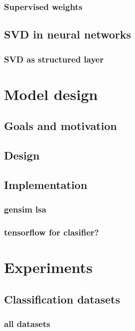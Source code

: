         \subsection{Supervised weights}
            \cite{ji2013discriminative} %
            \cite{deng2014study} %
            \cite{lan2009supervised} %

    
    \section{SVD in neural networks}
        \subsection{SVD as structured layer} 
            \cite{ionescu2015training} %

    
\chapter{Model design}
    \section{Goals and motivation}
    \section{Design}
    \section{Implementation}
        \subsection{gensim lsa}
        \subsection{tensorflow for clasifier?}
    \*
\chapter{Experiments}
    \section{Classification datasets}
        \subsection{all datasets}
            \cite{conneau2017supervised} %

